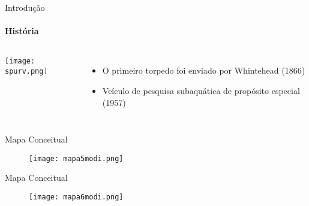 \begin{frame}[t]{Introdução}
    \transboxout[duration=0.5]
    \framesubtitle{História}
    \begin{columns}
        
               \texttt{[image: spurv.png]}
    
            \begin{itemize}
               \item O primeiro torpedo foi enviado por Whintehead (1866)
               \item Veículo de pesquisa subaquática de propósito especial (1957)
            \end{itemize}
    \end{columns}
\end{frame}
\begin{frame}[c]{Mapa Conceitual}
        \begin{figure}
        \texttt{[image: mapa5modi.png]}
    \end{figure}
\end{frame}
\begin{frame}[c]{Mapa Conceitual}
        \begin{figure}
        \texttt{[image: mapa6modi.png]}
    \end{figure}
\end{frame}
